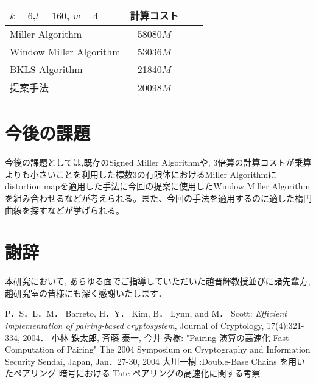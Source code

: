 \documentclass[twocolumn]{jsarticle} %
\begin{document}
\begin{table}[htbp]
 \begin{center}
  \begin{tabular}{|l|c|c|c|}
  \hline
  $k=6$,$l=160$, $w=4$ & 計算コスト \\
  \hline
  Miller Algorithm & 58080$M$ \\
  \hline
  Window Miller Algorithm & 53036$M$ \\
  \hline
  BKLS Algorithm &  21840$M$ \\
  \hline
  提案手法 & 20098$M$ \\
  \hline
  \end{tabular}
 \end{center}
\end{table}
\vspace{-2.5zh}
\section{今後の課題}
今後の課題としては,既存のSigned Miller Algorithmや, 3倍算の計算コストが乗算よりも小さいことを利用した標数3の有限体におけるMiller Algorithmにdistortion mapを適用した手法に今回の提案に使用したWindow Miller Algorithmを組み合わせるなどが考えられる。また、今回の手法を適用するのに適した楕円曲線を探すなどが挙げられる。
\vspace{-1zh}
\section*{謝辞}
本研究において, あらゆる面でご指導していただいた趙晋輝教授並びに諸先輩方, 趙研究室の皆様にも深く感謝いたします．
\vspace{-1zh}
\begin{thebibliography}{99}
 P．S．L．M． Barreto, H．Y． Kim, B． Lynn, and M． Scott: {\em Efficient implementation of pairing-based cryptosystem}, Journal of Cryptology, 17(4):321-334, 2004．
 小林 鉄太郎, 斉藤 泰一, 今井 秀樹: "Pairing 演算の高速化 Fast Computation of Pairing" The 2004 Symposium on Cryptography and Information Security Sendai, Japan, Jan．27-30, 2004
大川一樹 :Double-Base Chains を用いたペアリング 暗号における Tate ペアリングの高速化に関する考察

\end{thebibliography}

\end{document}
